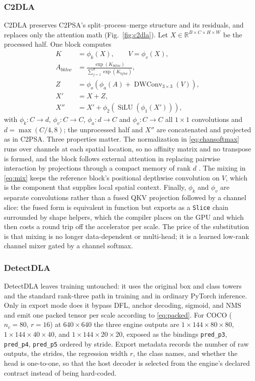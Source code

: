 \subsubsection{C2DLA}
C2DLA preserves C2PSA's split--process--merge structure and its residuals, and
replaces only the attention math (Fig.~\ref{fig:c2dla}). Let
$X\in\mathbb{R}^{B\times C\times H\times W}$ be the processed half. One block
computes
\begin{align}
K &= \phi_k(X), \qquad V = \phi_v(X), \label{eq:kv}\\
A_{bkhw} &= \frac{\exp(K_{bkhw})}{\sum_{j=1}^{d}\exp(K_{bjhw})},
  \label{eq:chansoftmax}\\
Z &= \phi_o\!\left(\phi_a(A)+
  \operatorname{DWConv}_{3\times3}(V)\right), \label{eq:mix}\\
X' &= X+Z, \label{eq:res1}\\
X'' &= X'+\phi_2\!\left(\operatorname{SiLU}(\phi_1(X'))\right),
  \label{eq:res2}
\end{align}
with $\phi_k:C\rightarrow d$, $\phi_v:C\rightarrow C$, $\phi_a:d\rightarrow C$
and $\phi_o:C\rightarrow C$ all $1\times1$ convolutions and
$d=\max(C/4,8)$; the unprocessed half and $X''$ are concatenated and projected
as in C2PSA. Three properties matter. The normalization in
\eqref{eq:chansoftmax} runs over channels at each spatial location, so no
affinity matrix and no transpose is formed, and the block follows external
attention in replacing pairwise interaction by projections through a compact
memory of rank $d$ \cite{guo2023external}. The mixing in \eqref{eq:mix} keeps
the reference block's positional depthwise convolution on $V$, which is the
component that supplies local spatial context. Finally, $\phi_k$ and $\phi_v$
are separate convolutions rather than a fused QKV projection followed by a
channel slice: the fused form is equivalent in function but exports as a
\texttt{Slice} chain surrounded by shape helpers, which the compiler places on
the GPU and which then costs a round trip off the accelerator per scale. The
price of the substitution is that mixing is no longer data-dependent or
multi-head; it is a learned low-rank channel mixer gated by a channel softmax.

\subsubsection{DetectDLA}
DetectDLA leaves training untouched: it uses the original box and class towers
and the standard rank-three path in training and in ordinary PyTorch inference.
Only in export mode does it bypass DFL, anchor decoding, sigmoid, and NMS and
emit one packed tensor per scale according to \eqref{eq:packed}. For COCO
($n_c=80$, $r=16$) at $640\times640$ the three engine outputs are
$1\times144\times80\times80$, $1\times144\times40\times40$, and
$1\times144\times20\times20$, exposed as the bindings \texttt{pred\_p3},
\texttt{pred\_p4}, \texttt{pred\_p5} ordered by stride. Export metadata records
the number of raw outputs, the strides, the regression width $r$, the class
names, and whether the head is one-to-one, so that the host decoder is selected
from the engine's declared contract instead of being hard-coded.

